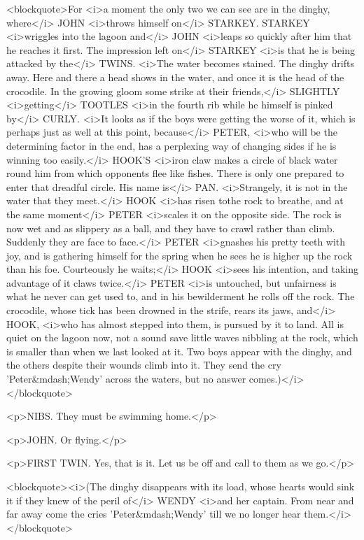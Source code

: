 <blockquote>For <i>a moment the only two we can see are in the dinghy, where</i> JOHN <i>throws himself on</i> STARKEY. STARKEY <i>wriggles into the lagoon and</i> JOHN <i>leaps so quickly after him that he reaches it first. The impression left on</i> STARKEY <i>is that he is being attacked by the</i> TWINS. <i>The water becomes stained. The dinghy drifts away. Here and there a head shows in the water, and once it is the head of the crocodile. In the growing gloom some strike at their friends,</i> SLIGHTLY <i>getting</i> TOOTLES <i>in the fourth rib while he himself is pinked by</i> CURLY. <i>It looks as if the boys were getting the worse of it, which is perhaps just as well at this point, because</i> PETER, <i>who will be the determining factor in the end, has a perplexing way of changing sides if he is winning too easily.</i> HOOK'S <i>iron claw makes a circle of black water round him from which opponents flee like fishes. There is only one prepared to enter that dreadful circle. His name is</i> PAN. <i>Strangely, it is not in the water that they meet.</i> HOOK <i>has risen tothe rock to breathe, and at the same moment</i> PETER <i>scales it on the opposite side. The rock is now wet and as slippery as a ball, and they have to crawl rather than climb. Suddenly they are face to face.</i> PETER <i>gnashes his pretty teeth with joy, and is gathering himself for the spring when he sees he is higher up the rock than his foe. Courteously he waits;</i> HOOK <i>sees his intention, and taking advantage of it claws twice.</i> PETER <i>is untouched, but unfairness is what he never can get used to, and in his bewilderment he rolls off the rock. The crocodile, whose tick has been drowned in the strife, rears its jaws, and</i> HOOK, <i>who has almost stepped into them, is pursued by it to land. All is quiet on the lagoon now, not a sound save little waves nibbling at the rock, which is smaller than when we last looked at it. Two boys appear with the dinghy, and the others despite their wounds climb into it. They send the cry 'Peter&mdash;Wendy' across the waters, but no answer comes.)</i></blockquote>

<p>NIBS. They must be swimming home.</p>

<p>JOHN. Or flying.</p>

<p>FIRST TWIN. Yes, that is it. Let us be off and call to them as we go.</p>

<blockquote><i>(The dinghy disappears with its load, whose hearts would sink it if they knew of the peril of</i> WENDY <i>and her captain. From near and far away come the cries 'Peter&mdash;Wendy' till we no longer hear them.</i></blockquote>

